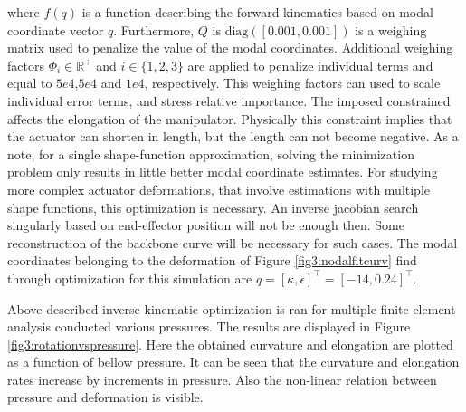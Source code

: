 where $f(q)$ is a function describing the forward kinematics based on modal coordinate vector $q$. Furthermore, $Q$ is $\text{diag}([0.001,0.001])$ is a weighing matrix used to penalize the value of the modal coordinates. Additional weighing factors $\Phi_i \in \mathbb{R}^+$ and $i \in \{1,2,3\}$ are applied to penalize individual terms and equal to $5e4$,$5e4$ and $1e4$, respectively. This weighing factors can used to scale individual error terms, and stress relative importance. The imposed constrained affects the elongation of the manipulator. Physically this constraint implies that the actuator can shorten in length, but the length can not become negative. As a note, for a single shape-function approximation, solving the minimization problem only results in little better modal coordinate estimates. For studying more complex actuator deformations, that involve estimations with multiple shape functions, this optimization is necessary. An inverse jacobian search singularly based on end-effector position will not be enough then. Some reconstruction of the backbone curve will be necessary for such cases. The modal coordinates belonging to the deformation of Figure \ref{fig3:nodalfitcurv} find through optimization for this simulation are $q = [\kappa,\epsilon]^\top = [-14,0.24]^\top$.




Above described inverse kinematic optimization is ran for multiple finite element analysis conducted various pressures. The results are displayed in Figure \ref{fig3:rotationvspressure}. Here the obtained curvature and elongation are plotted as a function of bellow pressure. It can be seen that the curvature and elongation rates increase by increments in pressure. Also the non-linear relation between pressure and deformation is visible.

